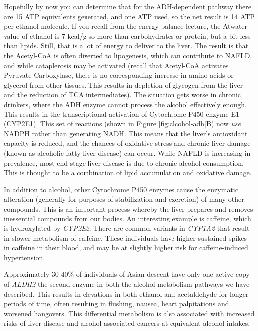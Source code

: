 \documentclass{tufte-handout}
\begin{document}
Hopefully by now you can determine that for the ADH-dependent pathway there are 15 ATP equivalents generated, and one ATP used, so the net result is 14 ATP per ethanol molecule.  If you recall from the energy balance lecture, the Atwater value of ethanol is 7 kcal/g so more than carbohydrates or protein, but a bit less than lipids.  Still, that is a lot of energy to deliver to the liver.  The result is that the Acetyl-CoA is often diverted to lipogenesis, which can contribute to NAFLD, and while cataplerosis may be activated (recall that Acetyl-CoA activates Pyruvate Carboxylase, there is no corresponding increase in amino acids or glycerol from other tissues.  This results in depletion of glycogen from the liver and the reduction of TCA intermediates).  The situation gets worse in chronic drinkers, where the ADH enzyme cannot process the alcohol effectively enough.  This results in the transcriptional activation of Cytochrome P450 enzyme E1 (CYP2E1).  This set of reactions (shown in Figure \ref{fig:alcohol-adh}B) now \emph{use} NADPH rather than generating NADH.  This means that the liver's antioxidant capacity is reduced, and the chances of oxidative stress and chronic liver damage (known as alcoholic fatty liver disease) can occur.  While NAFLD is increasing in prevalence, most end-stage liver disease is due to chronic alcohol consumption.  This is thought to be a combination of lipid accumulation and oxidative damage.

  In addition to alcohol, other Cytochrome P450 enzymes cause the enzymatic alteration (generally for purposes of stabilization and excretion) of many other compounds.  This is an important process whereby the liver prepares and removes inessential compounds from our bodies.  An interesting example is caffeine, which is hydroxylated by \textit{CYP2E2}.  There are common variants in \textit{CYP1A2} that result in slower metabolism of caffeine.  These individuals have higher sustained spikes in caffeine in their blood, and may be at slightly higher risk for caffeine-induced hypertension.

  Approximately 30-40\% of individuals of Asian descent have only one active copy of \textit{ALDH2} the second enzyme in both the alcohol metabolism pathways we have described.  This results in elevations in both ethanol and acetaldehyde for longer periods of time, often resulting in flushing, nausea, heart palpitations and worsened hangovers.  This differential metabolism is also associated with increased risks of liver disease and alcohol-associated cancers at equivalent alcohol intakes.



\end{document}
